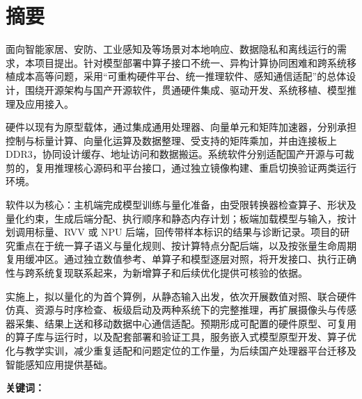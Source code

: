 \section*{摘要}
面向智能家居、安防、工业感知及\DrivingExtensionDirection{}等场景对本地响应、数据隐私和离线运行的需求，本项目提出\ProjectName{}。针对模型部署中算子接口不统一、异构计算协同困难和跨系统移植成本高等问题，采用“可重构硬件平台、统一推理软件、感知通信适配”的总体设计，围绕开源\ProcessorArchitecture{}架构与国产开源软件，贯通硬件集成、驱动开发、系统移植、模型推理及应用接入。

硬件以现有\BoardModel{}为原型载体，通过\IntegrationFramework{}集成\ProcessorCore{}通用处理器、\VectorUnit{}向量单元和\AcceleratorName{}矩阵加速器，分别承担控制与标量计算、向量化运算及数据整理、受支持的矩阵乘加，并由\MemoryController{}连接板上 DDR3，协同设计缓存、地址访问和数据搬运。系统软件分别适配国产开源\RealTimeSystem{}与可裁剪的\LinuxDistribution{}，复用推理核心源码和平台接口，通过独立镜像构建、重启切换验证两类运行环境。

软件以\RuntimeName{}为核心：主机端完成模型训练与量化准备，由受限转换器检查算子、形状及量化约束，生成后端分配、执行顺序和静态内存计划；板端加载模型与输入，按计划调用标量、RVV 或 NPU 后端，回传带样本标识的结果与诊断记录。项目的研究重点在于统一算子语义与量化规则、按计算特点分配后端，以及按张量生命周期复用缓冲区。通过独立数值参考、单算子和模型逐层对照，将开发接口、执行正确性与跨系统复现联系起来，为新增算子和后续优化提供可核验的依据。

实施上，拟以\ModelDataType{}量化的\AIModel{}为首个算例，从静态输入出发，依次开展数值对照、联合硬件仿真、资源与时序检查、板级启动及两种系统下的完整推理，再扩展摄像头与传感器采集、结果上送和移动数据中心通信适配。预期形成可配置的硬件原型、可复用的算子库与运行时，以及配套部署和验证工具，服务嵌入式模型原型开发、算子优化与教学实训，减少重复适配和问题定位的工作量，为后续国产处理器平台迁移及智能感知应用提供基础。

\par\noindent\textbf{关键词：}\ProjectKeywords{}
